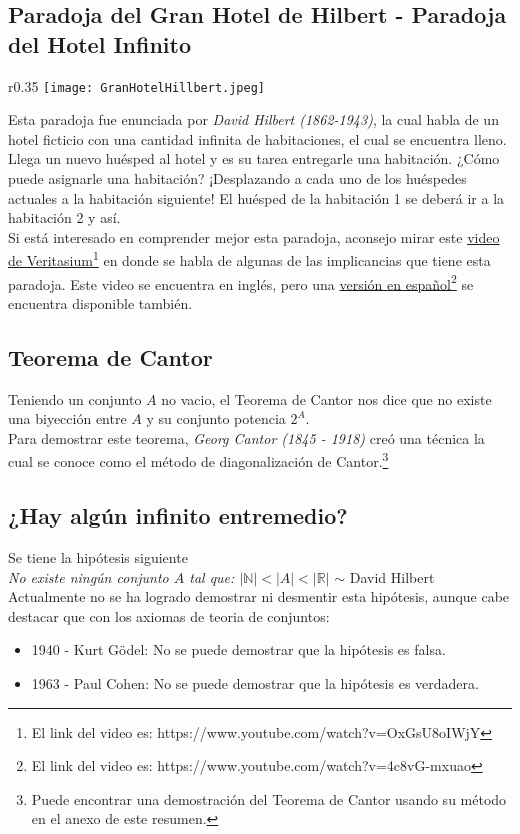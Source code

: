 \documentclass[../main.tex]{subfiles}
\begin{document}
\subsection{Paradoja del Gran Hotel de Hilbert - Paradoja del Hotel Infinito}
\begin{wrapfigure}{r}{0.35\textwidth}
    \centering
    \texttt{[image: GranHotelHillbert.jpeg]}
\end{wrapfigure}
Esta paradoja fue enunciada por \textit{David Hilbert (1862-1943)}, la cual habla de un hotel ficticio con una cantidad infinita de habitaciones, el cual se encuentra lleno. Llega un nuevo huésped al hotel y es su tarea entregarle una habitación. ¿Cómo puede asignarle una habitación? ¡Desplazando a cada uno de los huéspedes actuales a la habitación siguiente! El huésped de la habitación 1 se deberá ir a la habitación 2 y así.\\
Si está interesado en comprender mejor esta paradoja, aconsejo mirar este \href{https://www.youtube.com/watch?v=OxGsU8oIWjY}{video de Veritasium}\footnote{El link del video es: https://www.youtube.com/watch?v=OxGsU8oIWjY} en donde se habla de algunas de las implicancias que tiene esta paradoja. Este video se encuentra en inglés, pero una \href{https://www.youtube.com/watch?v=4c8vG-mxuao}{versión en español}\footnote{El link del video es: https://www.youtube.com/watch?v=4c8vG-mxuao} se encuentra disponible también.

\newpage

\subsection{Teorema de Cantor}
Teniendo un conjunto $A$ no vacio, el Teorema de Cantor nos dice que no existe una biyección entre $A$ y su conjunto potencia $2^A$.\\
Para demostrar este teorema, \textit{Georg Cantor (1845 - 1918)} creó una técnica la cual se conoce como el método de diagonalización de Cantor.\footnote{Puede encontrar una demostración del Teorema de Cantor usando su método en el anexo de este resumen.}

\subsection{¿Hay algún infinito entremedio?}
Se tiene la hipótesis siguiente\\
\textit{No existe ningún conjunto $A$ tal que: $|\mathds{N}| < |A| < |\mathds{R}|$} $\sim$ David Hilbert
Actualmente no se ha logrado demostrar ni desmentir esta hipótesis, aunque cabe destacar que con los axiomas de teoria de conjuntos:
\begin{itemize}
    \item 1940 - Kurt G\"{o}del: No se puede demostrar que la hipótesis es falsa.
    \item 1963 - Paul Cohen: No se puede demostrar que la hipótesis es verdadera.
\end{itemize}
\end{document}
